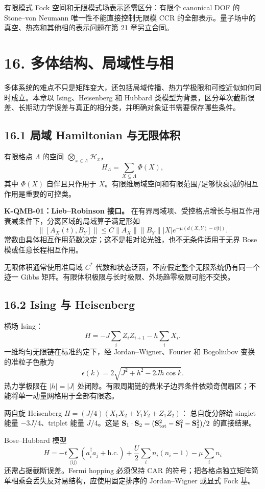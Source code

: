 \documentclass[
  11pt,
  oneside]{book}
\begin{document}
有限模式 Fock 空间和无限模式场表示还需区分：有限个 canonical DOF 的
Stone--von Neumann 唯一性不能直接控制无限模 CCR
的全部表示。量子场中的真空、热态和其他相的表示问题在第 21 章另立合同。

\chapter{16. 多体结构、局域性与相}\label{ch-16}\hypertarget{ch-16}{}

多体系统的难点不只是矩阵变大，还包括局域传播、热力学极限和可控近似如何同时成立。本章以
Ising、Heisenberg 和 Hubbard
类模型为背景，区分单次截断误差、长期动力学误差与真正的相分类，并明确对象证书需要保存哪些条件。

\section{16.1 局域 Hamiltonian 与无限体积}

有限格点 \(\Lambda\) 的空间 \(\bigotimes_{x\in\Lambda}\mathcal H_x\)，
\[
H_\Lambda=\sum_{X\subseteq\Lambda}\Phi(X),
\] 其中 \(\Phi(X)\) 自伴且只作用于
\(X\)。有限维局域空间和有限范围/足够快衰减的相互作用是重要的可控类。

\textbf{K-QMB-01：Lieb--Robinson 接口。}
在有界局域项、受控格点增长与相互作用衰减条件下，分离区域的局域算子满足形如
\[
\|[A_X(t),B_Y]\|
\le C\|A_X\|\|B_Y\||X|
e^{-\mu(d(X,Y)-v|t|)}.
\] 常数由具体相互作用范数决定；这不是相对论光锥，也不无条件适用于无界
Bose 模或任意长程相互作用。

无限体积通常使用准局域 \(C^*\)
代数和状态泛函，不应假定整个无限系统仍有同一个迹一 Gibbs
矩阵。有限体积极限与长时极限、外场趋零极限可能不交换。

\section{16.2 Ising 与 Heisenberg}

横场 Ising： \[
H=-J\sum_iZ_iZ_{i+1}-h\sum_iX_i.
\] 一维均匀无限链在标准约定下，经 Jordan--Wigner、Fourier 和 Bogoliubov
变换的准粒子色散为 \[
\epsilon(k)=2\sqrt{J^2+h^2-2Jh\cos k}.
\] 热力学极限在 \(|h|=|J|\)
处闭隙。有限周期链的费米子边界条件依赖奇偶扇区；不能将单一动量网格用于全部有限态。

两自旋 Heisenberg \(H=(J/4)(X_1X_2+Y_1Y_2+Z_1Z_2)\)： 总自旋分解给
singlet 能量 \(-3J/4\)、triplet 能量 \(J/4\)。这是
\(\mathbf S_1\cdot\mathbf S_2=(\mathbf S_{\rm tot}^2-\mathbf S_1^2-\mathbf S_2^2)/2\)
的直接结果。

Bose--Hubbard 模型 \[
H=-t\sum_{\langle ij\rangle}(a_i^\dagger a_j+\mathrm{h.c.})
+\frac U2\sum_i n_i(n_i-1)-\mu\sum_i n_i
\] 还需占据截断误差。Fermi hopping 必须保持 CAR
的符号；把各格点独立矩阵简单相乘会丢失反对易结构，应使用固定排序的
Jordan--Wigner 或显式 Fock 基。
\end{document}
